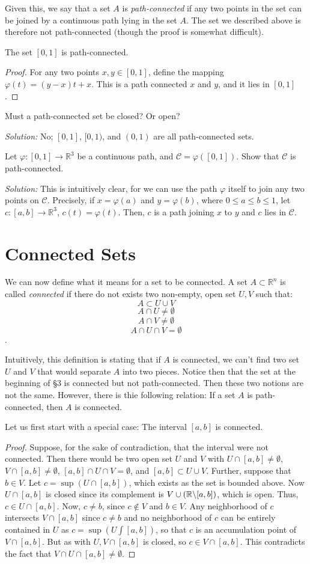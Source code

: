 \documentclass[11pt]{article}
\theoremstyle{definition}
\newcommand{\R}{\mathbb{R}}                      %
\begin{document}
Given this, we say that a set $A$ is \textit{path-connected} if any two points in the set can be joined by a continuous path lying in the set $A$. The set we described above is therefore not path-connected (though the proof is somewhat difficult).

\ex The set $[0,1]$ is path-connected.
\begin{proof}
    For any two points $x,y\in[0,1]$, define the mapping $\varphi(t)=(y-x)t+x$. This is a path connected $x$ and $y$, and it lies in $[0,1]$.
\end{proof}
\ex Must a path-connected set be closed? Or open?

\textit{Solution:} No; $[0,1]$, $[0,1)$, and $(0,1)$ are all path-connected sets.

\ex Let $\varphi:[0,1]\to \R^3$ be a continuous path, and $\mathcal{C}=\varphi([0,1])$. Show that $\mathcal{C}$ is path-connected.

\textit{Solution:} This is intuitively clear, for we can use the path $\varphi$ itself to join any two points on $\mathcal{C}$. Precisely, if $x=\varphi(a)$ and $y=\varphi(b)$, where $0\leq a\leq b \leq 1$, let $c:[a,b]\to \R^3$, $c(t)=\varphi(t)$. Then, $c$ is a path joining $x$ to $y$ and $c$ lies in $\mathcal{C}$.

\section{Connected Sets}
We can now define what it means for a set to be connected.
 A set $A\subset \R^n$ is called \textit{connected} if there do not exists two non-empty, open set $U, V$ such that:
\[A\subset U\cup V\]
\[A\cap U\neq \emptyset\]
\[A\cap V\neq \emptyset\]
\[A\cap U\cap V= \emptyset\].

Intuitively, this definition is stating that if $A$ is connected, we can't find two set $U$ and $V$ that would separate $A$ into two pieces. Notice then that the set at the beginning of \S3 is connected but not path-connected. Then these two notions are not the same. However, there is thie following relation:
\theorem If a set $A$ is path-connected, then $A$ is connected.

Let us first start with a special case:
\lem The interval $[a,b]$ is connected.
\begin{proof}
    Suppose, for the sake of contradiction, that the interval were not connected. Then there would be two open set $U$ and $V$ with $U\cap [a,b]\neq \emptyset$, $V\cap [a,b]\neq\emptyset$, $[a,b]\cap U\cap V = \emptyset$, and $[a,b]\subset U\cup V$. Further, suppose that $b\in V$. Let $c=\sup(U\cap [a,b])$, which exists as the set is bounded above. Now $U\cap [a,b]$ is closed since its complement is $V\cup (\R\symbol{92}[a,b])$, which is open. Thus, $c\in U\cap [a,b]$. Now, $c\neq b$, since $c\not\in V$ and $b\in V$. Any neighborhood of $c$ intersects $V\cap [a,b]$ since $c\neq b$ and no neighborhood of $c$ can be entirely contained in $U$ as $c=\sup(U\int [a,b])$, so that $c$ is an accumulation point of $V\cap[a,b]$. But as with $U,V\cap[a,b]$ is closed, so $c\in V\cap [a,b]$. This contradicts the fact that $V\cap U\cap [a,b]\neq \emptyset$.
\end{proof}
\end{document}
